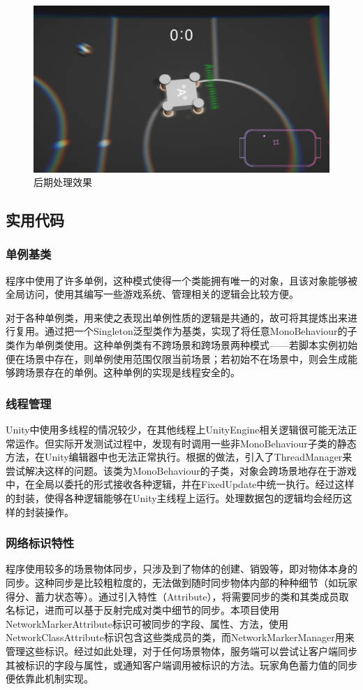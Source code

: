 \documentclass[conference]{IEEEtran}
\begin{document}
\begin{figure}[htbp]
  \centerline{\includegraphics[width=.38\textwidth]{images/pp.png}}
  \caption{后期处理效果}
  \label{fig:pp}
\end{figure}

\subsection{实用代码}
\subsubsection{单例基类}
\quad

程序中使用了许多单例，这种模式使得一个类能拥有唯一的对象，且该对象能够被全局访问，使用其编写一些游戏系统、管理相关的逻辑会比较方便。

对于各种单例类，用来使之表现出单例性质的逻辑是共通的，故可将其提炼出来进行复用\cite{myCite:singleton}。通过把一个Singleton泛型类作为基类，实现了将任意MonoBehaviour的子类作为单例类使用。这种单例类有不跨场景和跨场景两种模式——若脚本实例初始便在场景中存在，则单例使用范围仅限当前场景；若初始不在场景中，则会生成能够跨场景存在的单例。这种单例的实现是线程安全的。

\subsubsection{线程管理}
\quad

Unity中使用多线程的情况较少，在其他线程上UnityEngine相关逻辑很可能无法正常运作。但实际开发测试过程中，发现有时调用一些非MonoBehaviour子类的静态方法，在Unity编辑器中也无法正常执行。根据\cite{myCite:Tom}的做法，引入了ThreadManager来尝试解决这样的问题。该类为MonoBehaviour的子类，对象会跨场景地存在于游戏中，在全局以委托的形式接收各种逻辑，并在FixedUpdate中统一执行。经过这样的封装，使得各种逻辑能够在Unity主线程上运行。处理数据包的逻辑均会经历这样的封装操作。

\subsubsection{网络标识特性}
\quad

程序使用较多的场景物体同步，只涉及到了物体的创建、销毁等，即对物体本身的同步。这种同步是比较粗粒度的，无法做到随时同步物体内部的种种细节（如玩家得分、蓄力状态等）。通过引入特性（Attribute），将需要同步的类和其类成员取名标记，进而可以基于反射完成对类中细节的同步。本项目使用NetworkMarkerAttribute标识可被同步的字段、属性、方法，使用NetworkClassAttribute标识包含这些类成员的类，而NetworkMarkerManager用来管理这些标识。经过如此处理，对于任何场景物体，服务端可以尝试让客户端同步其被标识的字段与属性，或通知客户端调用被标识的方法。玩家角色蓄力值的同步便依靠此机制实现。
\end{document}
